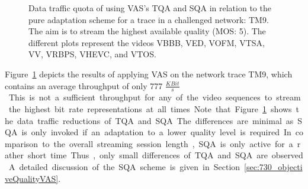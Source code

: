 \begin{figure}[!htb]
 \caption[Data traffic quota of VAS for a challenged network trace.]{Data traffic quota of using VAS's TQA and SQA in relation to the pure adaptation scheme for a trace in a challenged network: TM9. The aim is to stream the highest available quality (MOS: 5). The different plots represent the videos VBBB, VED, VOFM, VTSA, VV, VRBPS, VHEVC, and VTOS.}
 \label{fig:730_trafficReductionTM9}
\end{figure}

Figure~\ref{fig:730_trafficReductionTM9} depicts the results of applying \ac{VAS} on the network trace TM9, which contains an average throughput of only 777 \unit{$\frac{KBit}{s}$}.
This is not a sufficient throughput for any of the video sequences to stream the highest bit rate representations at all times.

Note that Figure~\ref{fig:730_trafficReductionTM9} shows the data traffic reductions of \ac{TQA} and \ac{SQA}. 
The differences are minimal as \ac{SQA} is only invoked if an adaptation to a lower quality level is required. 
In comparison to the overall streaming session length, \ac{SQA} is only active for a rather short time.
Thus, only small differences of \ac{TQA} and \ac{SQA} are observed.
A detailed discussion of the \ac{SQA} scheme is given in Section~\ref{sec:730_objectiveQualityVAS}.

